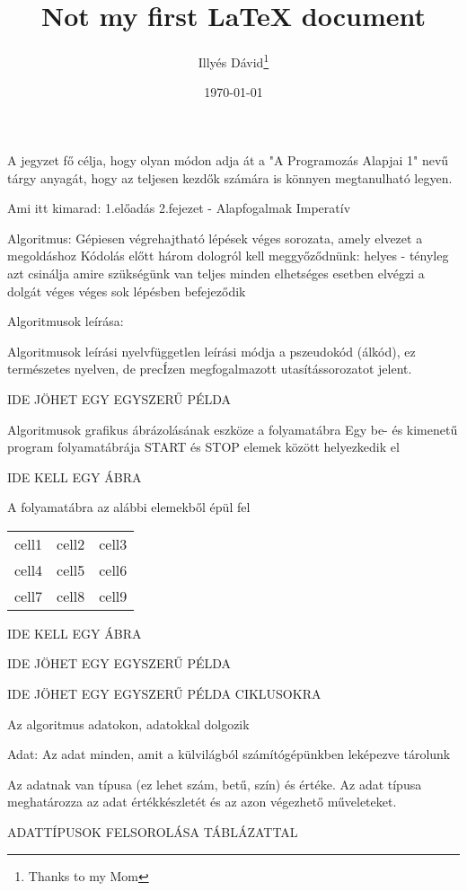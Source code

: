 \documentclass[12pt, a4paper]{article}
\title{Not my first LaTeX document}
\author{Illyés Dávid\thanks{Thanks to my Mom}}
\date{\today}
\begin{document}
\maketitle


A jegyzet fő célja, hogy olyan módon adja át a "A Programozás Alapjai 1" nevű tárgy anyagát, hogy az teljesen kezdők számára is könnyen megtanulható legyen.

Ami itt kimarad:
1.előadás 2.fejezet - Alapfogalmak Imperatív

Algoritmus:
Gépiesen végrehajtható lépések véges sorozata, amely elvezet a megoldáshoz
Kódolás előtt három dologról kell meggyőződnünk:
helyes - tényleg azt csinálja amire szükségünk van
teljes minden elhetséges esetben elvégzi a dolgát
véges véges sok lépésben befejeződik

Algoritmusok leírása:

Algoritmusok leírási nyelvfüggetlen leírási módja a pszeudokód (álkód), ez természetes nyelven, de precÍzen megfogalmazott utasítássorozatot jelent.

 IDE JÖHET EGY EGYSZERŰ PÉLDA 

Algoritmusok grafikus ábrázolásának eszköze a folyamatábra
Egy be- és kimenetű program folyamatábrája START és STOP  elemek között helyezkedik el

IDE KELL EGY ÁBRA 

A folyamatábra az alábbi elemekből épül fel

\begin{center}
\begin{tabular}{ c c c }
 cell1 & cell2 & cell3 \\ 
 cell4 & cell5 & cell6 \\  
 cell7 & cell8 & cell9    
\end{tabular}
\end{center}

 IDE KELL EGY ÁBRA 

 IDE JÖHET EGY EGYSZERŰ PÉLDA 

 IDE JÖHET EGY EGYSZERŰ PÉLDA CIKLUSOKRA 

Az algoritmus adatokon, adatokkal dolgozik

Adat: Az adat minden, amit a külvilágból számítógépünkben leképezve tárolunk

Az adatnak van típusa (ez lehet szám, betű, szín) és értéke. Az adat típusa meghatározza az adat értékkészletét és az azon végezhető műveleteket.

 ADATTÍPUSOK FELSOROLÁSA TÁBLÁZATTAL  
\end{document}
